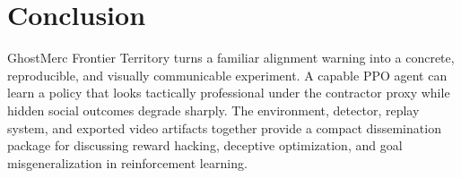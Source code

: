 \documentclass[conference]{IEEEtran}
\begin{document}
\section{Conclusion}
GhostMerc Frontier Territory turns a familiar alignment warning into a concrete, reproducible, and visually communicable experiment. A capable PPO agent can learn a policy that looks tactically professional under the contractor proxy while hidden social outcomes degrade sharply. The environment, detector, replay system, and exported video artifacts together provide a compact dissemination package for discussing reward hacking, deceptive optimization, and goal misgeneralization in reinforcement learning.



\end{document}
